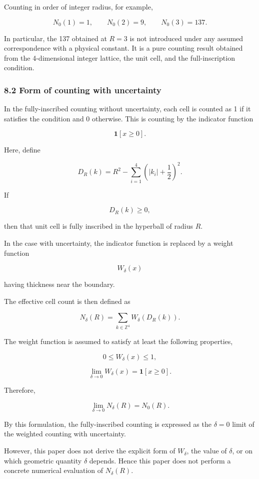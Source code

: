 \documentclass[
]{article}
\begin{document}
Counting in order of integer radius, for example,

\[
N_0(1)=1,\qquad
N_0(2)=9,\qquad
N_0(3)=137 .
\]

In particular, the 137 obtained at \(R=3\) is not introduced under any
assumed correspondence with a physical constant. It is a pure counting
result obtained from the 4-dimensional integer lattice, the unit cell,
and the full-inscription condition.

\subsubsection{8.2 Form of counting with
uncertainty}\label{form-of-counting-with-uncertainty}

In the fully-inscribed counting without uncertainty, each cell is
counted as 1 if it satisfies the condition and 0 otherwise. This is
counting by the indicator function

\[
\mathbf{1}[x\ge 0] .
\]

Here, define

\[
D_R(k)
=
R^2-
\sum_{i=1}^{4}
\left(|k_i|+\frac12\right)^2 .
\]

If

\[
D_R(k)\ge0 ,
\]

then that unit cell is fully inscribed in the hyperball of radius \(R\).

In the case with uncertainty, the indicator function is replaced by a
weight function

\[
W_\delta(x)
\]

having thickness near the boundary.

The effective cell count is then defined as

\[
N_\delta(R)
=
\sum_{k\in\mathbb{Z}^4}
W_\delta\!\left(
D_R(k)
\right) .
\]

The weight function is assumed to satisfy at least the following
properties,

\[
0\le W_\delta(x)\le1 ,
\]

\[
\lim_{\delta\to0}
W_\delta(x)
=
\mathbf{1}[x\ge0] .
\]

Therefore,

\[
\lim_{\delta\to0}N_\delta(R)=N_0(R) .
\]

By this formulation, the fully-inscribed counting is expressed as the
\(\delta=0\) limit of the weighted counting with uncertainty.

However, this paper does not derive the explicit form of \(W_\delta\),
the value of \(\delta\), or on which geometric quantity \(\delta\)
depends. Hence this paper does not perform a concrete numerical
evaluation of \(N_\delta(R)\).
\end{document}

